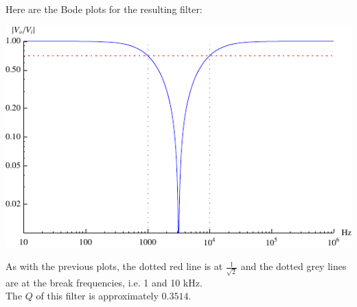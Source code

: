 \documentclass[12pt,a4paper]{report}
\begin{document}
Here are the Bode plots for the resulting filter:

\includegraphics[scale=1.4]{Graphics/bsf_magnitude_plot}

As with the previous plots, the dotted red line is at $\displaystyle \frac{1}{\sqrt{2}}$ and the dotted grey lines are at the break frequencies, i.e. 1 and 10 kHz.\\
The $Q$ of this filter is approximately $0.3514$.

\begin{comment}
f[x_] = If[x < -\[Pi]/2, x + \[Pi], x]

LogLinearPlot[{f[-ArcTan[
      1 - (\[Omega]*2*Pi)^2 L c, (\[Omega]*2*Pi) R c]]*180/Pi, -45, 
  45}, {\[Omega], 10, 10^6}, 
 PlotStyle -> {Blue, {Red, Dotted}, {Red, Dotted}}, 
 AxesLabel -> {Hz, "Degrees"}, GridLines -> {{10^3, 10^4}, None}, 
 GridLinesStyle -> Dotted, PlotRange -> Full, 
 Ticks -> {Automatic, Union[{-45, 45}, Range[90, -90, -10]]}]
\end{comment}
\end{document}
